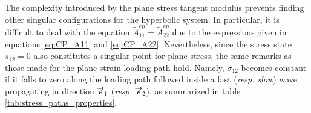 The complexity introduced by the plane stress tangent modulus prevents finding other singular configurations for the hyperbolic system. 
In particular, it is difficult to deal with the equation $\widetilde{A}^{ep}_{11}=\widetilde{A}^{ep}_{22}$ due to the expressions given in equations \eqref{eq:CP_A11} and \eqref{eq:CP_A22}.
Nevertheless, since the stress state $s_{12}=0$ also constitutes a singular point for plane stress, the same remarks as those made for the plane strain loading path hold.
Namely, $\sigma_{12}$ becomes constant if it falls to zero along the loading path followed inside a fast (\textit{resp. slow}) wave propagating in direction ${\overrightarrow{e}}_1$ (\textit{resp. ${\overrightarrow{e}}_2$}), as summarized in table \ref{tab:stress_paths_properties}.



